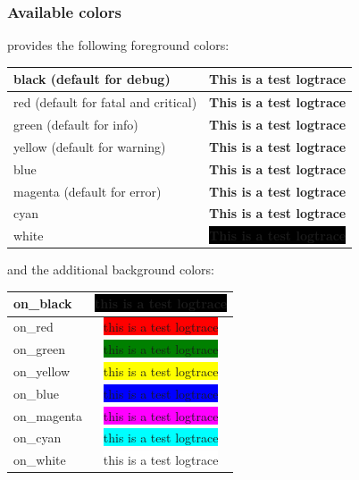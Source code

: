 \subsubsection{Available colors}
\logftailer{} provides the following foreground colors:

\begin{center}
\begin{tabular}{|l || c|}
\hline
 black (default for debug) & {\color{black} \textbf{This is a test logtrace}} \\ 
\hline
 red (default for fatal and critical) & {\color{red} \textbf{This is a test logtrace}} \\ 
\hline
 green (default for info) & {\color{green} \textbf{This is a test logtrace}} \\ 
\hline
yellow (default for warning) & {\color{yellow} \textbf{This is a test logtrace}} \\ 
\hline
 blue & {\color{blue} \textbf{This is a test logtrace}} \\ 
\hline 
magenta (default for error) & {\color{magenta} \textbf{This is a test logtrace}} \\ 
\hline
 cyan & {\color{cyan} \textbf{This is a test logtrace}} \\ 
\hline 
white & \colorbox{black}{\color{white}\textbf{This is a test logtrace}} \\
\hline
\end{tabular}
\end{center}

and the additional background colors:
\begin{center}
\begin{tabular}{|l | c |}
  \hline
 on\_black & \colorbox{black}{\color{green}this is a test logtrace} \\
 \hline
 on\_red & \colorbox{red}{this is a test logtrace} \\
 \hline
on\_green & \colorbox{green}{this is a test logtrace} \\
 \hline
on\_yellow & \colorbox{yellow}{this is a test logtrace} \\
 \hline
 on\_blue & \colorbox{blue}{this is a test logtrace} \\
 \hline
 on\_magenta & \colorbox{magenta}{this is a test logtrace} \\
 \hline 
on\_cyan & \colorbox{cyan}{this is a test logtrace} \\
 \hline 
on\_white & \colorbox{white}{this is a test logtrace} \\
\hline
\end{tabular}
\end{center}

